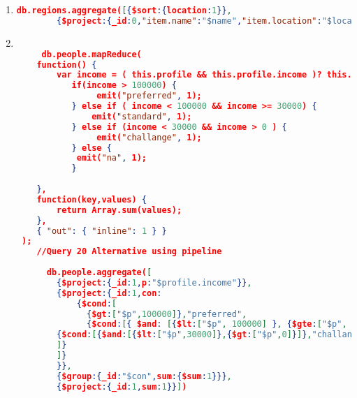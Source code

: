 \begin{enumerate}[label=Q\arabic*]
    \item \label{mongodb-q-19}%
	\begin{lstlisting}[language=JSON,   basicstyle=\scriptsize]
	  db.regions.aggregate([{$sort:{location:1}},
		{$project:{_id:0,"item.name":"$name","item.location":"$location"}}])
	\end{lstlisting}	
    
    \item \label{mongodb-q-20}%
	\begin{lstlisting}[language=JSON,   basicstyle=\scriptsize]
	
	 db.people.mapReduce(
    function() {
        var income = ( this.profile && this.profile.income )? this.profile.income : 0;
           if(income > 100000) {
                emit("preferred", 1);   
           } else if ( income < 100000 && income >= 30000) {
               emit("standard", 1);
           } else if (income < 30000 && income > 0 ) {
                emit("challange", 1);
           } else {
            emit("na", 1);
           }
       
    },
    function(key,values) {
        return Array.sum(values);
    },
    { "out": { "inline": 1 } }
 );
 	//Query 20 Alternative using pipeline
	
	  db.people.aggregate([
		{$project:{_id:1,p:"$profile.income"}},
		{$project:{_id:1,con:
			{$cond:[
			  {$gt:["$p",100000]},"preferred",
			  {$cond:[{ $and: [{$lt:["$p", 100000] }, {$gte:["$p", 30000] }] },"standard",
		{$cond:[{$and:[{$lt:["$p",30000]},{$gt:["$p",0]}]},"challange","na"]}
		]}
		]}
		}},
		{$group:{_id:"$con",sum:{$sum:1}}},
		{$project:{_id:1,sum:1}}])
		

    
	\end{lstlisting}
\end{enumerate}
